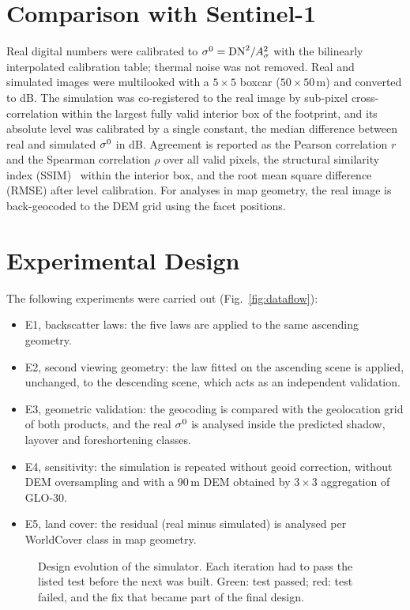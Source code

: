 \section{Comparison with Sentinel-1}
Real digital numbers were calibrated to $\sigma^0=\mathrm{DN}^2/A_\sigma^2$ with the bilinearly interpolated calibration table; thermal noise was not removed. Real and simulated images were multilooked with a $5\times5$ boxcar ($50\times50$\,m) and converted to dB. The simulation was co-registered to the real image by sub-pixel cross-correlation within the largest fully valid interior box of the footprint, and its absolute level was calibrated by a single constant, the median difference between real and simulated $\sigma^0$ in dB. Agreement is reported as the Pearson correlation $r$ and the Spearman correlation $\rho$ over all valid pixels, the structural similarity index (SSIM)~\cite{wang2004} within the interior box, and the root mean square difference (RMSE) after level calibration. For analyses in map geometry, the real image is back-geocoded to the DEM grid using the facet positions.

\section{Experimental Design}
The following experiments were carried out (Fig.~\ref{fig:dataflow}):
\begin{itemize}
\item E1, backscatter laws: the five laws are applied to the same ascending geometry.
\item E2, second viewing geometry: the law fitted on the ascending scene is applied, unchanged, to the descending scene, which acts as an independent validation.
\item E3, geometric validation: the geocoding is compared with the geolocation grid of both products, and the real $\sigma^0$ is analysed inside the predicted shadow, layover and foreshortening classes.
\item E4, sensitivity: the simulation is repeated without geoid correction, without DEM oversampling and with a 90\,m DEM obtained by $3\times3$ aggregation of GLO-30.
\item E5, land cover: the residual (real minus simulated) is analysed per WorldCover class in map geometry.
\end{itemize}

\begin{figure}[htbp]
\centering
\resizebox{\textwidth}{!}{}
\caption[Data flow of the simulator]{Data flow of the simulator. Blue: inputs; green: simulation; beige: real-image path; orange: products. The dashed loop fits the backscatter law to the real image and feeds it back into the simulation.}
\label{fig:dataflow}
\vspace{8mm}
\resizebox{\textwidth}{!}{}
\caption[Design evolution of the simulator]{Design evolution of the simulator. Each iteration had to pass the listed test before the next was built. Green: test passed; red: test failed, and the fix that became part of the final design.}
\label{fig:design}
\end{figure}

